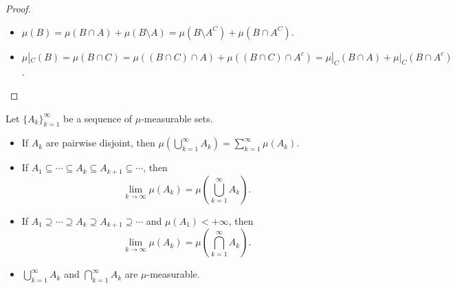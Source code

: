     \begin{proof}
        \begin{itemize}
            \item[(ii)] $\mu(B)=\mu(B\cap A)+\mu(B\setminus A)=\mu(B\setminus A^{C})+\mu(B\cap A^{C})$.
            \item[(iv)] $\mu|_{C}(B)=\mu(B\cap C)=\mu((B\cap C)\cap A)+\mu((B\cap C)\cap A^{c})=\mu|_{C}(B\cap A)+\mu|_{C}(B\cap A^{c})$.\qedhere
        \end{itemize}
    \end{proof}

    \begin{theorem}
        \label{thm:property of sequences of measurable sets}
        Let $\{ A_{k} \}_{k=1}^{\infty}$ be a sequence of $\mu$-measurable sets.
        \begin{itemize}
            \item[(i)] If $A_{k}$ are pairwise disjoint, then $\mu(\bigcup_{k=1}^{\infty} A_{k})=\sum_{k=1}^{\infty}\mu(A_{k})$.
            \item[(ii)] If $A_1\subseteq \cdots \subseteq A_{k} \subseteq A_{k+1} \subseteq \cdots$, then
            $$
            \lim_{k \to \infty} \mu(A_{k})=\mu\left(\bigcup_{k=1}^{\infty} A_{k}\right).
            $$
            \item[(iii)] If $A_1\supseteq \cdots \supseteq A_{k} \supseteq A_{k+1} \supseteq \cdots$ and $\mu(A_{1})<+\infty$, then
            $$
            \lim_{k \to \infty} \mu(A_{k})=\mu\left(\bigcap_{k=1}^{\infty} A_{k}\right).
            $$
            \item[(iv)] $\bigcup_{k=1}^{\infty}A_{k}$ and $\bigcap_{k=1}^{\infty}A_{k}$ are $\mu$-measurable.
        \end{itemize}
    \end{theorem}

